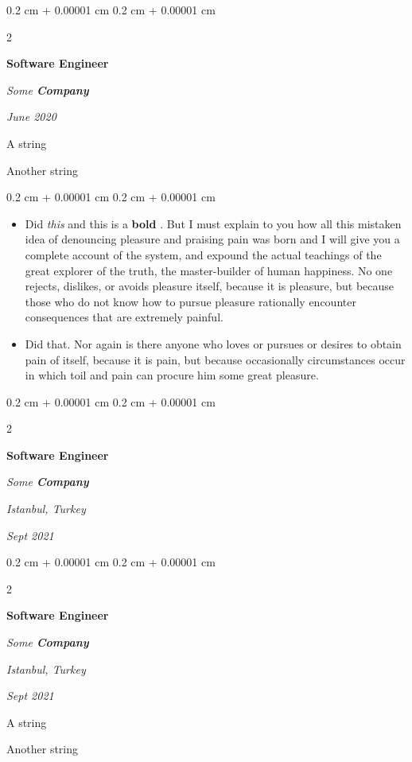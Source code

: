 \documentclass[10pt, letterpaper]{article}
\newenvironment{summary}{
    \begin{description}[
        topsep=0.10 cm,
        parsep=0.10 cm,
        partopsep=0pt,
        itemsep=0pt,
        leftmargin=0.4 cm + 10pt
    ]
}{
    \end{description}
} %
\newenvironment{highlights}{
    \begin{itemize}[
        topsep=0.10 cm,
        parsep=0.10 cm,
        partopsep=0pt,
        itemsep=0pt,
        leftmargin=0.4 cm + 10pt
    ]
}{
    \end{itemize}
} %
\newenvironment{onecolentry}{
    \begin{adjustwidth}{
        0.2 cm + 0.00001 cm
    }{
        0.2 cm + 0.00001 cm
    }
}{
    \end{adjustwidth}
} %
\newenvironment{twocolentry}[2][]{
    \onecolentry
    \def\secondColumn{#2}
    \setcolumnwidth{\fill, 4.5 cm}
    \begin{paracol}{2}
}{
    \switchcolumn \raggedleft \secondColumn
    \end{paracol}
    \endonecolentry
} %
\let\hrefWithoutArrow\href
\renewcommand{\href}[2]{\hrefWithoutArrow{#1}{\ifthenelse{\equal{#2}{}}{ }{#2 }\raisebox{.15ex}{\footnotesize \faExternalLink*}}}
\begin{document}
        \begin{twocolentry}{
            
            
        \textit{June 2020}}
            \textbf{Software Engineer}
            
            \textit{Some \textbf{Company}}
        \end{twocolentry}
            \begin{summary}
                \item A string
                \item Another string
            \end{summary}
        \vspace{0.10 cm}
        \begin{onecolentry}
            \begin{highlights}
                \item Did \textit{this} and this is a \textbf{bold} \href{https://example.com}{link}. But I must explain to you how all this mistaken idea of denouncing pleasure and praising pain was born and I will give you a complete account of the system, and expound the actual teachings of the great explorer of the truth, the master-builder of human happiness. No one rejects, dislikes, or avoids pleasure itself, because it is pleasure, but because those who do not know how to pursue pleasure rationally encounter consequences that are extremely painful.
                \item Did that. Nor again is there anyone who loves or pursues or desires to obtain pain of itself, because it is pain, but because occasionally circumstances occur in which toil and pain can procure him some great pleasure.
            \end{highlights}
        \end{onecolentry}


        \vspace{0.2 cm}

        \begin{twocolentry}{
        \textit{Istanbul, Turkey}    
            
        \textit{Sept 2021}}
            \textbf{Software Engineer}
            
            \textit{Some \textbf{Company}}
        \end{twocolentry}


        \vspace{0.2 cm}

        \begin{twocolentry}{
        \textit{Istanbul, Turkey}    
            
        \textit{Sept 2021}}
            \textbf{Software Engineer}
            
            \textit{Some \textbf{Company}}
        \end{twocolentry}
            \begin{summary}
                \item A string
                \item Another string
            \end{summary}
\end{document}
